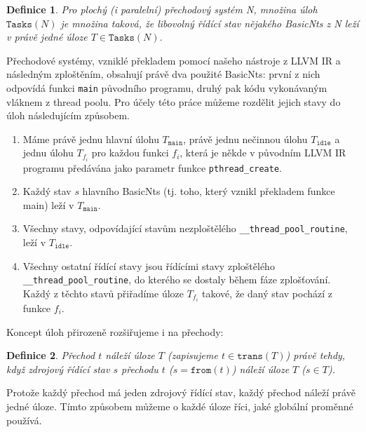 \documentclass[10pt,a4paper,notitlepage]{report}
\newtheorem{definition}{Definice}
\begin{document}
\begin{definition}
Pro plochý (i paralelní) přechodový systém N, množina úloh $\texttt{Tasks}(N)$ je množina taková, že libovolný řídící stav nějakého BasicNts z N leží v právě jedné úloze $T \in \texttt{Tasks}(N)$.
\end{definition}

Přechodové systémy, vzniklé překladem pomocí našeho nástroje z LLVM IR a následným zploštěním, obsahují právě dva použité BasicNts: první z nich odpovídá funkci \texttt{main} původního programu, druhý pak kódu vykonávaným vláknem z thread poolu. Pro účely této práce můžeme rozdělit jejich stavy do úloh následujícím způsobem.

\begin{enumerate}
\item Máme právě jednu hlavní úlohu $T_{\texttt{main}}$, právě jednu nečinnou úlohu $T_{\texttt{idle}}$ a jednu úlohu $T_{f_i}$ pro každou funkci $f_i$, která je někde v původním LLVM IR programu předávána jako parametr funkce \texttt{pthread\_create}.
\item Každý stav $s$ hlavního BasicNts (tj. toho, který vznikl překladem funkce main) leží v $T_{\texttt{main}}$.
\item Všechny stavy, odpovídající stavům nezploštělého \texttt{\_\_thread\_pool\_routine}, leží v $T_{\texttt{idle}}$.
\item Všechny ostatní řídící stavy jsou řídícími stavy zploštělého \texttt{\_\_thread\_pool\_routine}, do kterého se dostaly během fáze zplošťování. Každý z těchto stavů přiřadíme úloze $T_{f_i}$ takové, že daný stav pochází z funkce $f_i$.
\end{enumerate}

Koncept úloh přirozeně rozšiřujeme i na přechody:
\begin{definition}
Přechod $t$ náleží úloze $T$ (zapisujeme $t \in \texttt{trans}(T)$) právě tehdy, když zdrojový řídící stav $s$ přechodu $t$ ($s = \texttt{from}(t)$) náleží úloze $T$ ($s \in T$).
\end{definition}
Protože každý přechod má jeden zdrojový řídící stav, každý přechod náleží právě jedné úloze. Tímto způsobem můžeme o každé úloze říci, jaké globální proměnné používá.
\end{document}
